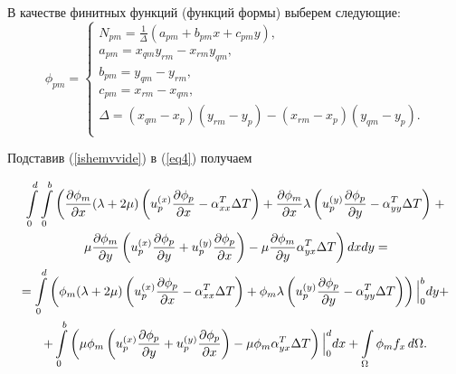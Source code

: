 \documentclass[12pt, a4paper]{article}
\begin{document}
В качестве финитных функций (функций формы) выберем следующие:
\[
\phi_{pm} = 
\begin{cases}
	N_{pm}=\frac{1}{\Delta}\left(a_{pm}+b_{pm} x+c_{pm} y\right),\\
	a_{pm}=x_{qm}y_{rm}-x_{rm}y_{qm},\\
	b_{pm}=y_{qm}-y_{rm},\\
	c_{pm}=x_{rm}-x_{qm},\\
	\Delta=(x_{qm}-x_p)(y_{rm}-y_p)-(x_{rm}-x_p)(y_{qm}-y_p).\\
\end{cases}
\]

Подставив (\ref{ishemvvide}) в (\ref{eq4}) получаем

\begin{multline}
	\int\limits_0^d\int\limits_0^b \left(\frac{\partial \phi_m}{\partial x}(\lambda+2\mu)\left(u_p^{(x)}\frac{\partial \phi_p}{\partial x}-\alpha_{xx}^T\Delta T\right)+\frac{\partial \phi_m}{\partial x}\lambda\left(u_p^{(y)}\frac{\partial \phi_p}{\partial y}-\alpha_{yy}^T\Delta T\right)\right.+\\ \left.
	\mu \frac{\partial \phi_m}{\partial y}\left(u_p^{(x)}\frac{\partial \phi_p}{\partial y}+ u_p^{(y)}\frac{\partial \phi_p}{\partial x}\right)-\mu \frac{\partial \phi_m}{\partial y}\alpha_{yx}^T\Delta T\right)dxdy=\\
	=\int\limits_0^d \left(\phi_m(\lambda+2\mu)\left(u_p^{(x)}\frac{\partial \phi_p}{\partial x}-\alpha_{xx}^T\Delta T\right)+\phi_m\lambda\left(u_p^{(y)}\frac{\partial \phi_p}{\partial y}-\alpha_{yy}^T\Delta T\right)\right)\Big|_0^b dy+\\
	+\int\limits_0^b \left(\mu \phi_m\left( u_p^{(x)}\frac{\partial \phi_p}{\partial y}+ u_p^{(y)}\frac{\partial \phi_p}{\partial x}\right)-\mu \phi_m\alpha_{yx}^T\Delta T\right)\Big|_0^d dx	+\int\limits_{\Omega}\phi_m f_{x}\,d\Omega.
	\label{equilib1}
\end{multline}
\end{document}
